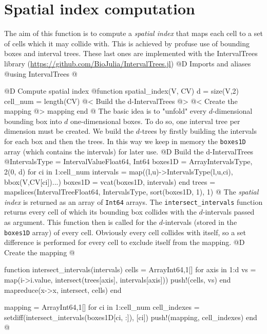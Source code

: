 \documentclass[10pt,oneside]{article}
\begin{document}
\section{Spatial index computation}
The aim of this function is to compute a \textit{spatial index} that maps
each cell to a set of cells which it may collide with.
This is achieved by profuse use of bounding boxes and interval trees. 
These last ones are implemented with the IntervalTrees library
(\url{https://github.com/BioJulia/IntervalTrees.jl})
@D Imports and aliases
@{using IntervalTrees
@}

@D Compute spatial index
@{function spatial_index(V, CV)
    d = size(V,2)
    cell_num = length(CV)
    @< Build the d-IntervalTrees @>
    @< Create the mapping @>
    mapping
end
@}
The basic idea is to "unfold" every $d$-dimensional bounding box into $d$ one-dimensional boxes.
To do so, one interval tree per dimension must be created. 
We build the $d$-trees by firstly building the intervals for each box and then the trees.
In this way we keep in memory the \texttt{boxes1D} array (which contains the intervals) for later use.
@D Build the d-IntervalTrees
@{IntervalsType = IntervalValue{Float64, Int64}
boxes1D = Array{IntervalsType, 2}(0, d)
for ci in 1:cell_num
    intervals = map((l,u)->IntervalsType(l,u,ci), bbox(V,CV[ci])...)
    boxes1D = vcat(boxes1D, intervals)
end
trees = mapslices(IntervalTree{Float64, IntervalsType}, sort(boxes1D, 1), 1)
@}
The \textit{spatial index} is returned as an array of \texttt{Int64} arrays.
The \texttt{intersect\_intervals} function returns every cell of which its bounding box collides with 
the $d$-intervals passed as argument. This function then is called for the $d$-intervals (stored in the \texttt{boxes1D} array) of every cell.
Obviously every cell collides with itself, so a set difference is performed for every cell to exclude itself from the mapping.
@D Create the mapping
@{function intersect_intervals(intervals)
    cells = Array{Int64,1}[]
    for axis in 1:d
        vs = map(i->i.value, intersect(trees[axis], intervals[axis]))
        push!(cells, vs)
    end
    mapreduce(x->x, intersect, cells)
end

mapping = Array{Int64,1}[]
for ci in 1:cell_num
    cell_indexes = setdiff(intersect_intervals(boxes1D[ci, :]), [ci])
    push!(mapping, cell_indexes)
end
@}

\end{document}
